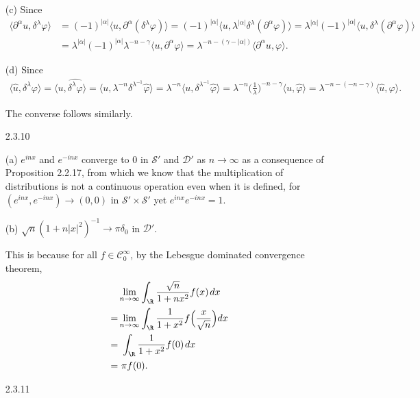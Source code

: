 \begin{itemize}
(c) Since
\begin{align*}
    \langle \partial^{\alpha}u,\delta^{\lambda}\varphi \rangle
    &= (-1)^{|\alpha|}\langle u,\partial^{\alpha}(\delta^{\lambda}\varphi) \rangle
    = (-1)^{|\alpha|}\langle u,\lambda^{|\alpha|}\delta^{\lambda}(\partial^{\alpha}\varphi) \rangle
    = \lambda^{|\alpha|}(-1)^{|\alpha|}\langle u, \delta^{\lambda}(\partial^{\alpha}\varphi)\rangle
    \\&=
    \lambda^{|\alpha|}(-1)^{|\alpha|}\lambda^{-n-\gamma}\langle u,\partial^{\alpha}\varphi\rangle
    = \lambda^{-n-(\gamma-|\alpha|)}\langle \partial^{\alpha}u,\varphi\rangle.
\end{align*}

(d) Since
\begin{align*}
    \langle \hat{u},\delta^{\lambda}\varphi \rangle = \langle u,\widehat{\delta^{\lambda}\varphi} \rangle
    = \langle u,\lambda^{-n}\delta^{\lambda^{-1}}\hat{\varphi} \rangle 
    = \lambda^{-n}\langle u,\delta^{\lambda^{-1}}\hat{\varphi} \rangle
    = \lambda^{-n}\Big(\frac{1}{\lambda}\Big)^{-n-\gamma}\langle u,\hat{\varphi} \rangle
    = \lambda^{-n-(-n-\gamma)}\langle \hat{u},\varphi \rangle.
\end{align*}

The converse follows similarly.

\item[2.3.10]

(a) $e^{inx}$ and $e^{-inx}$ converge to $0$ in $\mathscr{S}'$ and $\mathscr{D}'$ 
as $n\rightarrow\infty$ as a consequence of Proposition 2.2.17, 
from which we know that the multiplication of distributions is not 
a continuous operation even when it is defined, 
for $(e^{inx},e^{-inx})\rightarrow(0,0)$ in $\mathscr{S}'\times\mathscr{S}'$ 
yet $e^{inx}e^{-inx}=1$.

(b) $\sqrt{n}(1+n|x|^2)^{-1}\rightarrow\pi\delta_0$ in $\mathscr{D}'$.

This is because for all $f\in\mathscr{C}_0^\infty$, 
by the Lebesgue dominated convergence theorem,
\begin{align*}
    &\lim_{n\rightarrow\infty}\int_\R \frac{\sqrt{n}}{1+nx^2}f(x)\>dx\\
    =&\lim_{n\rightarrow\infty}\int_\R \frac{1}{1+x^2}f\Big(\frac{x}{\sqrt{n}}\Big)dx\\
    =&\ \int_\R \frac{1}{1+x^2}f(0)\>dx\\
    =&\ \pi f(0).
\end{align*}

\item[2.3.11]


\end{itemize}
